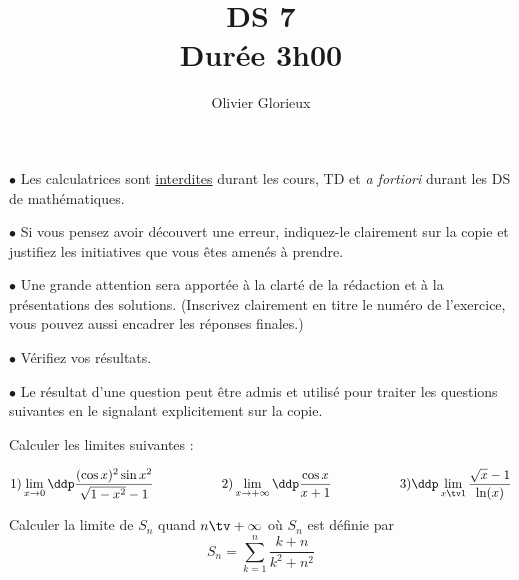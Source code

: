 \documentclass[a4paper, 11pt,reqno]{article}
\author{Olivier Glorieux}
\begin{document}
\title{DS 7\\
\Large{Durée 3h00}
}




\vspace{1cm}
\begin{center}

\begin{description}
\item$\bullet$ Les calculatrices sont \underline{interdites} durant les cours, TD et \emph{a fortiori} durant les DS de mathématiques. \\

\item $\bullet $ Si vous pensez avoir découvert une erreur, indiquez-le clairement sur la copie et justifiez les initiatives que vous êtes amenés à prendre. \\

\item $\bullet$ Une grande attention sera apportée à la clarté de la rédaction et à la présentations des solutions. (Inscrivez clairement en titre le numéro de l'exercice, vous pouvez aussi encadrer les réponses finales.)  \\

\item $\bullet$ Vérifiez vos résultats. \\

\item $\bullet$ Le résultat d'une question peut être admis et utilisé pour traiter les questions suivantes en le signalant explicitement sur la copie. 
\end{description}

\end{center} 

\newpage
\begin{exercice}
Calculer les limites suivantes : 


$$1) \lim\limits_{x\to 0} \ddp\frac{(\cos{x})^2\sin{x^2}}{\sqrt{1-x^2}-1} \quad \hspace{1.5cm }2) \lim\limits_{x\to +\infty} \ddp\frac{\cos{x}}{x+1} \quad \hspace{1.5cm } 3)  \ddp \lim_{x \tv 1} \frac{\sqrt{x}-1}{ \ln(x)}$$

\end{exercice}

\vspace{1cm}


\begin{exercice}

Calculer la limite de $S_n$ quand $n\tv +\infty$ où $S_n$ est définie par 
$$S_n=\sum_{k=1}^n \frac{k+n}{k^2+n^2}$$
\end{exercice}
\end{document}

